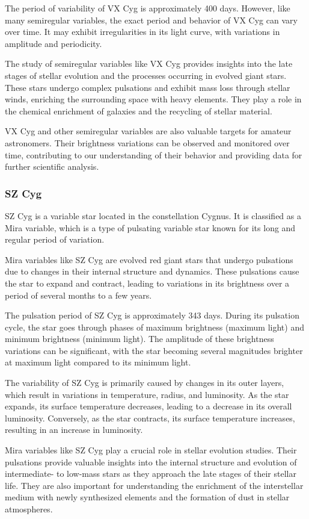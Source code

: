 The period of variability of VX Cyg is approximately 400 days. However, like many semiregular variables, the exact period and behavior of VX Cyg can vary over time. It may exhibit irregularities in its light curve, with variations in amplitude and periodicity.

The study of semiregular variables like VX Cyg provides insights into the late stages of stellar evolution and the processes occurring in evolved giant stars. These stars undergo complex pulsations and exhibit mass loss through stellar winds, enriching the surrounding space with heavy elements. They play a role in the chemical enrichment of galaxies and the recycling of stellar material.

VX Cyg and other semiregular variables are also valuable targets for amateur astronomers. Their brightness variations can be observed and monitored over time, contributing to our understanding of their behavior and providing data for further scientific analysis.

\subsubsection*{ SZ Cyg }
SZ Cyg is a variable star located in the constellation Cygnus. It is classified as a Mira variable, which is a type of pulsating variable star known for its long and regular period of variation.

Mira variables like SZ Cyg are evolved red giant stars that undergo pulsations due to changes in their internal structure and dynamics. These pulsations cause the star to expand and contract, leading to variations in its brightness over a period of several months to a few years.

The pulsation period of SZ Cyg is approximately 343 days. During its pulsation cycle, the star goes through phases of maximum brightness (maximum light) and minimum brightness (minimum light). The amplitude of these brightness variations can be significant, with the star becoming several magnitudes brighter at maximum light compared to its minimum light.

The variability of SZ Cyg is primarily caused by changes in its outer layers, which result in variations in temperature, radius, and luminosity. As the star expands, its surface temperature decreases, leading to a decrease in its overall luminosity. Conversely, as the star contracts, its surface temperature increases, resulting in an increase in luminosity.

Mira variables like SZ Cyg play a crucial role in stellar evolution studies. Their pulsations provide valuable insights into the internal structure and evolution of intermediate- to low-mass stars as they approach the late stages of their stellar life. They are also important for understanding the enrichment of the interstellar medium with newly synthesized elements and the formation of dust in stellar atmospheres.

